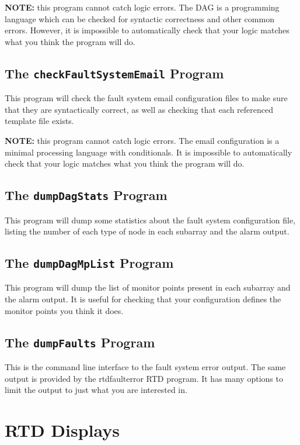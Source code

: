 \documentclass[letterpaper,12pt,oneside,pdftex]{article}
\begin{document}
\textbf{NOTE:} this program cannot catch logic errors. The DAG is a programming
language which can be checked for syntactic correctness and other common errors.
However, it is impossible to automatically check that your logic matches what
you think the program will do.

\subsection{The \texttt{checkFaultSystemEmail} Program}

This program will check the fault system email configuration files to make sure
that they are syntactically correct, as well as checking that each referenced
template file exists.

\textbf{NOTE:} this program cannot catch logic errors. The email configuration
is a minimal processing language with conditionals. It is impossible to
automatically check that your logic matches what you think the program will do.

\subsection{The \texttt{dumpDagStats} Program}

This program will dump some statistics about the fault system configuration
file, listing the number of each type of node in each subarray and the alarm
output.

\subsection{The \texttt{dumpDagMpList} Program}

This program will dump the list of monitor points present in each subarray and
the alarm output. It is useful for checking that your configuration defines the
monitor points you think it does.

\subsection{The \texttt{dumpFaults} Program}

This is the command line interface to the fault system error output. The same
output is provided by the rtdfaulterror RTD program. It has many options to
limit the output to just what you are interested in.

\section{RTD Displays}
\end{document}
